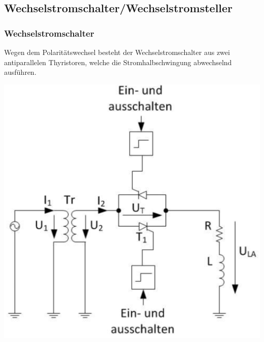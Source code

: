 \subsection{Wechselstromschalter/Wechselstromsteller}
\subsubsection{Wechselstromschalter}
\begin{minipage}{\linewidth}
    Wegen dem Polaritätswechsel besteht der Wechselstromschalter aus zwei antiparallelen Thyristoren, welche die Stromhalbschwingung abwechselnd ausführen.
\end{minipage}

\begin{minipage}{0.3\linewidth}
    \includegraphics[width=\linewidth]{images/SchemaWSSchalter}
\end{minipage}
